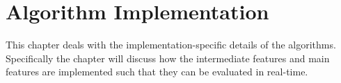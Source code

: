 \chapter{Algorithm Implementation}
This chapter deals with the implementation-specific details of the algorithms. Specifically the chapter will discuss how the intermediate features and main features are implemented such that they can be evaluated in real-time.






